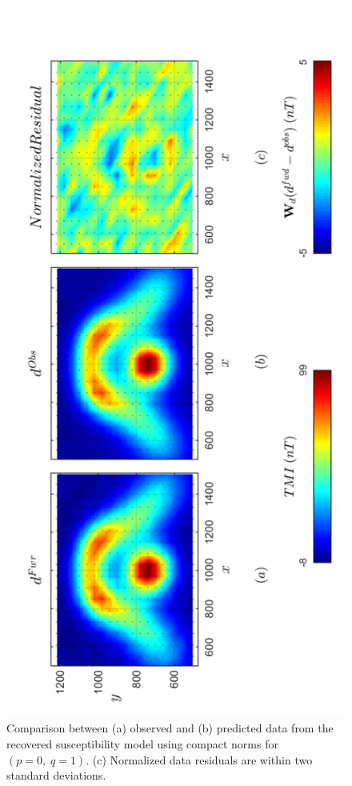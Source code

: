 \begin{figure}[h!]
\centering
\includegraphics[scale=0.52, angle =270]{3D_Inv_l0l0_pred_INDUCED.pdf}
\caption{ Comparison between (a) observed and (b) predicted data from the recovered susceptibility model using compact norms for  $(p = 0,\; q = 1)$. (c) Normalized data residuals are within two standard deviations.}
\label{fig:3D_Inv_l0l0_pred_INDUCED}
\end{figure}


